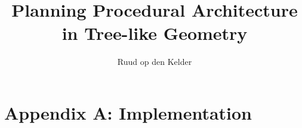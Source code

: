 \documentclass[10pt,a4paper,fleqn]{book}
\title{Planning Procedural Architecture in Tree-like Geometry}
\author{Ruud op den Kelder}
\renewcommand{\headrulewidth}{0pt}
\begin{document}
\frontmatter




\tableofcontents

\mainmatter
\fancyhead[LO]{\leftmark}







 




\appendix
\noappendicestocpagenum
\addappheadtotoc

\pagestyle{fancy}
\fancyhead[LO]{\leftmark}
\renewcommand{\headrulewidth}{0.5pt}

\chapter*{Appendix A: Implementation}
\label{sec:implementation}


\newpage 
\pagestyle{plain}
\end{document}
